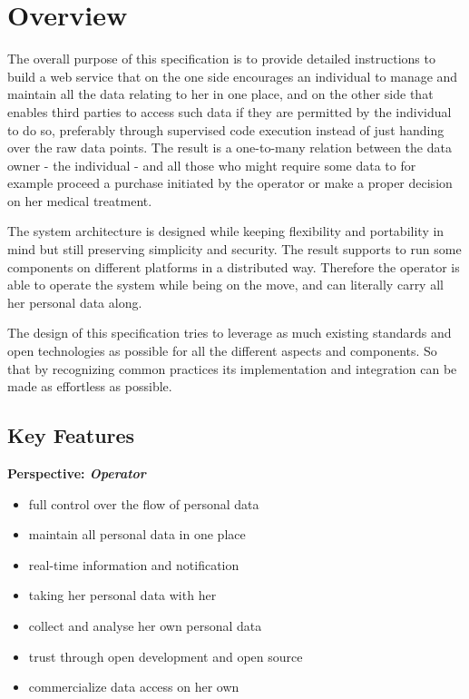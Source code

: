 \documentclass[12pt,english,a4paper,titlepage,cleardoublepage=empty,dottedtoc]{report}
\providecommand{\tightlist}{%
  \setlength{\itemsep}{0pt}\setlength{\parskip}{0pt}}
\begin{document}
\section{Overview}\label{overview}

The overall purpose of this specification is to provide detailed
instructions to build a web service that on the one side encourages an
individual to manage and maintain all the data relating to her in one
place, and on the other side that enables third parties to access such
data if they are permitted by the individual to do so, preferably
through supervised code execution instead of just handing over the raw
data points. The result is a one-to-many relation between the data owner
- the individual - and all those who might require some data to for
example proceed a purchase initiated by the operator or make a proper
decision on her medical treatment.

The system architecture is designed while keeping flexibility and
portability in mind but still preserving simplicity and security. The
result supports to run some components on different platforms in a
distributed way. Therefore the operator is able to operate the system
while being on the move, and can literally carry all her personal data
along.

The design of this specification tries to leverage as much existing
standards and open technologies as possible for all the different
aspects and components. So that by recognizing common practices its
implementation and integration can be made as effortless as possible.

\subsection{Key Features}\label{key-features}

\textbf{Perspective: \emph{Operator}}

\begin{itemize}
\tightlist
\item
  full control over the flow of personal data
\item
  maintain all personal data in one place
\item
  real-time information and notification
\item
  taking her personal data with her
\item
  collect and analyse her own personal data
\item
  trust through open development and open source
\item
  commercialize data access on her own
\end{itemize}
\end{document}

